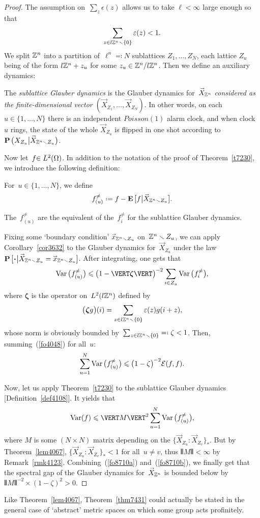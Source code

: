 \begin{proof}
The assumption on~$\sum_z\epsilon(z)$ allows us to take $\ell < \infty$ large enough so that
\[ \sum_{z\in l\mathbb{Z}^n\smallsetminus\{0\}} \varepsilon(z) < 1 .\]
We split $\mathbb{Z}^n$ into a partition of~$\ell^n \eqqcolon N$ sublattices $Z_1, \ldots, Z_N$,
each lattice $Z_u$ being of the form $l \mathbb{Z}^n + z_u$ for some $z_u\in\mathbb{Z}^n/l\mathbb{Z}^n$.
Then we define an auxiliary dynamics:
%
\begin{Def}\label{def4108}
The \emph{sublattice Glauber dynamics} is the Glauber dynamics for~$\vec{X}_{\ZZ^n}$
\emph{considered as the finite-dimensional vector
$(\vec{X}_{Z_1},\ldots,\vec{X}_{Z_N})$}.
In other words, on each~$u\in\{1,\ldots,N\}$
there is an independent $\mathit{Poisson}(1)$ alarm clock,
and when clock $u$ rings, the state of the whole $\vec{X}_{Z_u}$ is flipped in one shot
according to~$\Pr\big(X_{Z_u}\big|\vec{X}_{\ZZ^n\setminus Z_u}\big)$.
\end{Def}

Now let~$f \ab {\in \ldb(\Omega)}$.
In addition to the notation of the proof of Theorem~\ref{t7230},
we introduce the following definition:
%
\begin{Def}
For~$u \in \{1,\ldots,N\}$, we define
\[ f_{(u)}^{\neq} \coloneqq f - \EE\big[ f \big| \vec{X}_{\ZZ^n \setminus Z_u} \big] .\]
\end{Def}
%
\begin{Rmk}\label{rmk8840}
The~$f_{(u)}^{\neq}$ are the equivalent of the~$f_i^{\neq}$ for the sublattice Glauber dynamics.
\end{Rmk}

Fixing some `boundary condition' $\vec{x}_{\ZZ^n\setminus Z_u}$ on~$\mathbb{Z}^n\smallsetminus Z_u$,
we can apply Corollary~\ref{cor3632} to the Glauber dynamics
for~$\vec{X}_{Z_u}$ under the law
$\Pr\big[\Bcdot\big|\vec{X}_{\ZZ^n\setminus Z_u}=\vec{x}_{\ZZ^n\setminus Z_u}\big]$.
After integrating, one gets that
\[\label{fo4048} \Var\big( f_{(u)}^{\neq} \big) \leq
\big(1-\VERT\boldsymbol\zeta\VERT\big)^{-2} \sum_{i\in Z_u} \Var\big( f_i^{\neq} \big) ,\]
where $\boldsymbol\zeta$ is the operator on~$L^2(l\mathbb{Z}^n)$ defined by
\[ \big(\boldsymbol\zeta g\big)(i)
= \sum_{z\in\ell\ZZ^n\setminus\{0\}} \epsilon(z) g(i+z) ,\]
whose norm is obviously bounded by~$\sum_{z\in\ell\ZZ^n\setminus\{0\}} \eqqcolon \zeta < 1$.
Then, summing~(\ref{fo4048}) for all~$u$:
\[\label{fo8710a} \sum_{u=1}^N \Var\big( f_{(u)}^{\neq} \big) \leq
\big(1-\zeta\big)^{-2} \mcal{E}(f,f) .\]

Now, let us apply Theorem~\ref{t7230} to the sublattice Glauber dynamics [Definition~\ref{def4108}].
It yields that
\[\label{fo8710b} \Var(f) \leq \VERT M\VERT^2 \sum_{u=1}^N \Var\big( f_{(u)}^{\neq} \big) ,\]
where $M$ is some $(N\times N)$ matrix depending on the
${\{ \vec{X}_{Z_u} : \vec{X}_{Z_v} \}_*}$.
But by Theorem~\ref{lem4067},
${\{ \vec{X}_{Z_u} : \vec{X}_{Z_v} \}_*} < 1$ for all~$u\neq v$,
thus $\VERT M\VERT < \infty$ by Remark~\ref{rmk4123}.
Combining~(\ref{fo8710a}) and~(\ref{fo8710b}), we finally get that
the spectral gap of the Glauber dynamics
for~$\vec{X}_{\ZZ^n}$ is bounded below by~$\VERT M\VERT^{-2} \times (1-\zeta)^2 > 0$.\linebreak[1]\strut
\end{proof}

\begin{Rmk}
Like Theorem~\ref{lem4067}, Theorem~\ref{thm7431} could actually be stated
in the general case of `abstract' metric spaces on which some group acts profinitely.
\end{Rmk}

